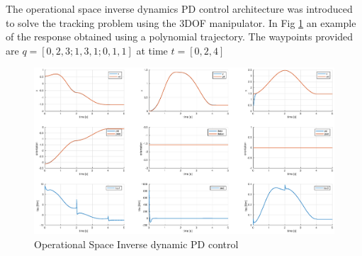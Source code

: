 \documentclass[a4paper,12pt]{article}
\begin{document}
The operational space inverse dynamics PD control architecture was introduced to solve the tracking problem using the 3DOF manipulator. In Fig \ref{fig:op_inv_dyn} an example of the response obtained using a polynomial trajectory. The waypoints provided are $ q = [0,2,3;1,3,1;0,1,1] $ at time $t = [ 0, 2, 4 ] $
\begin{figure}[H]
    \begin{center}
        \hspace*{-4.5cm}
        \includegraphics[scale=0.5]{images/op_inv_dyn.eps}
    \end{center}
    \caption{Operational Space Inverse dynamic PD control}
    \label{fig:op_inv_dyn}
\end{figure}
\end{document}
